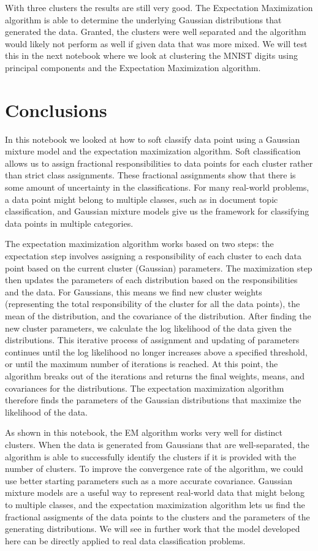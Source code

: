 \documentclass[12pt]{article}
\begin{document}
    With three clusters the results are still very good. The Expectation
Maximization algorithm is able to determine the underlying Gaussian
distributions that generated the data. Granted, the clusters were well
separated and the algorithm would likely not perform as well if given
data that was more mixed. We will test this in the next notebook where
we look at clustering the MNIST digits using principal components and
the Expectation Maximization algorithm.

    \hypertarget{conclusions}{%
\section{Conclusions}\label{conclusions}}

In this notebook we looked at how to soft classify data point using a
Gaussian mixture model and the expectation maximization algorithm. Soft
classification allows us to assign fractional responsibilities to data
points for each cluster rather than strict class assignments. These
fractional assignments show that there is some amount of uncertainty in
the classifications. For many real-world problems, a data point might
belong to multiple classes, such as in document topic classification,
and Gaussian mixture models give us the framework for classifying data
points in multiple categories.

The expectation maximization algorithm works based on two steps: the
expectation step involves assigning a responsibility of each cluster to
each data point based on the current cluster (Gaussian) parameters. The
maximization step then updates the parameters of each distribution based
on the responsibilities and the data. For Gaussians, this means we find
new cluster weights (representing the total responsibility of the
cluster for all the data points), the mean of the distribution, and the
covariance of the distribution. After finding the new cluster
parameters, we calculate the log likelihood of the data given the
distributions. This iterative process of assignment and updating of
parameters continues until the log likelihood no longer increases above
a specified threshold, or until the maximum number of iterations is
reached. At this point, the algorithm breaks out of the iterations and
returns the final weights, means, and covariances for the distributions.
The expectation maximization algorithm therefore finds the parameters of
the Gaussian distributions that maximize the likelihood of the data.

As shown in this notebook, the EM algorithm works very well for distinct
clusters. When the data is generated from Gaussians that are
well-separated, the algorithm is able to successfully identify the
clusters if it is provided with the number of clusters. To improve the
convergence rate of the algorithm, we could use better starting
parameters such as a more accurate covariance. Gaussian mixture models
are a useful way to represent real-world data that might belong to
multiple classes, and the expectation maximization algorithm lets us
find the fractional assigments of the data points to the clusters and
the parameters of the generating distributions. We will see in further
work that the model developed here can be directly applied to real data
classification problems.


    
    
    
    
\end{document}
